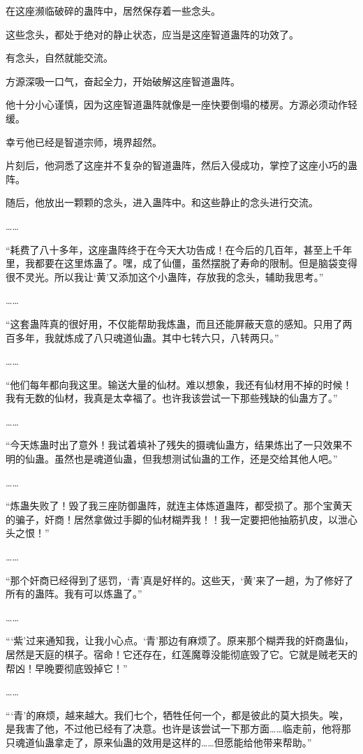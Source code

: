 \begin{this_body}
在这座濒临破碎的蛊阵中，居然保存着一些念头。

这些念头，都处于绝对的静止状态，应当是这座智道蛊阵的功效了。

有念头，自然就能交流。

方源深吸一口气，奋起全力，开始破解这座智道蛊阵。

他十分小心谨慎，因为这座智道蛊阵就像是一座快要倒塌的楼房。方源必须动作轻缓。

幸亏他已经是智道宗师，境界超然。

片刻后，他洞悉了这座并不复杂的智道蛊阵，然后入侵成功，掌控了这座小巧的蛊阵。

随后，他放出一颗颗的念头，进入蛊阵中。和这些静止的念头进行交流。

……

“耗费了八十多年，这座蛊阵终于在今天大功告成！在今后的几百年，甚至上千年里，我都要在这里炼蛊了。嘿，成了仙僵，虽然摆脱了寿命的限制。但是脑袋变得很不灵光。所以我让‘黄’又添加这个小蛊阵，存放我的念头，辅助我思考。”

……

“这套蛊阵真的很好用，不仅能帮助我炼蛊，而且还能屏蔽天意的感知。只用了两百多年，我就炼成了八只魂道仙蛊。其中七转六只，八转两只。”

……

“他们每年都向我这里。输送大量的仙材。难以想象，我还有仙材用不掉的时候！我有无数的仙材，我真是太幸福了。也许我该尝试一下那些残缺的仙蛊方了。”

……

“今天炼蛊时出了意外！我试着填补了残失的摄魂仙蛊方，结果炼出了一只效果不明的仙蛊。虽然也是魂道仙蛊，但我想测试仙蛊的工作，还是交给其他人吧。”

……

“炼蛊失败了！毁了我三座防御蛊阵，就连主体炼道蛊阵，都受损了。那个宝黄天的骗子，奸商！居然拿做过手脚的仙材糊弄我！！我一定要把他抽筋扒皮，以泄心头之恨！”

……

“那个奸商已经得到了惩罚，‘青’真是好样的。这些天，‘黄’来了一趟，为了修好了所有的蛊阵。我有可以炼蛊了。”

……

“‘紫’过来通知我，让我小心点。‘青’那边有麻烦了。原来那个糊弄我的奸商蛊仙，居然是天庭的棋子。宿命！它还存在，红莲魔尊没能彻底毁了它。它就是贼老天的帮凶！早晚要彻底毁掉它！”

……

“‘青’的麻烦，越来越大。我们七个，牺牲任何一个，都是彼此的莫大损失。唉，是我害了他，不过他已经有了决意。也许是该尝试一下那方面……临走前，他将那只魂道仙蛊拿走了，原来仙蛊的效用是这样的……但愿能给他带来帮助。”


\end{this_body}
